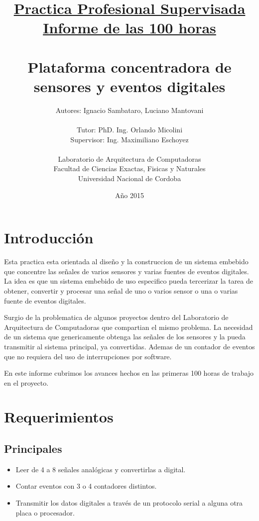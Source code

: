 \documentclass{article}
\title{\underline{Practica Profesional Supervisada} \\
\large \underline{Informe de las 100 horas} \\
\huge \textbf{ \\ Plataforma concentradora de sensores y eventos digitales} \\ }
\author{Autores: Ignacio Sambataro, Luciano Mantovani\\ \\
  \large Tutor: PhD. Ing. Orlando Micolini \\
  \large Supervisor: Ing. Maximiliano Eschoyez \\ \\
  \small Laboratorio de Arquitectura de Computadoras\\
  \small Facultad de Ciencias Exactas, Fisicas y Naturales\\
  \small Universidad Nacional de Cordoba\\
  \date{Año 2015}
}
\theoremstyle{definition}
\theoremstyle{remark}
\begin{document}
\maketitle


\clearpage

\tableofcontents

\clearpagess

\section{Introducción}
Esta practica esta orientada al diseño y la construccion de un sistema embebido que concentre las señales de varios sensores y varias fuentes de eventos digitales. La idea es que un sistema embebido de uso especifico pueda tercerizar la tarea de obtener, convertir y procesar una señal de uno o varios sensor o una o varias fuente de eventos digitales.

Surgio de la problematica de algunos proyectos dentro del Laboratorio de Arquitectura de Computadoras que compartian el mismo problema. La necesidad de un sistema que genericamente obtenga las señales de los sensores y la pueda transmitir al sistema principal, ya convertidas. Ademas de un contador de eventos que no requiera del uso de interrupciones por software.

En este informe cubrimos los avances hechos en las primeras 100 horas de trabajo en el proyecto.


\section{Requerimientos}
\subsection{Principales}
\begin{itemize}
  \item Leer de 4 a 8 señales analógicas y convertirlas a digital.
  \item Contar eventos con 3 o 4 contadores distintos.
  \item Transmitir los datos digitales a través de un protocolo serial a alguna otra placa o procesador.
\end{itemize}
\end{document}
